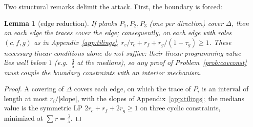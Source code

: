 \documentclass[11pt,reqno]{amsart}
\theoremstyle{plain}
\newtheorem{lemma}[theorem]{Lemma}
\theoremstyle{definition}
\theoremstyle{remark}
\begin{document}
Two structural remarks delimit the attack. First, the boundary is forced:

\begin{lemma}[edge reduction]\label{lem:edgered}
If planks $P_1,P_2,P_3$ (one per direction) cover $\Delta$, then on each edge
the traces cover the edge; consequently, on each edge with roles $(c,f,g)$ as
in Appendix~\ref{app:tilings},
$r_c/\tau_c+r_f+r_g/(1-\tau_g)\ge1$. These necessary linear conditions alone
do \emph{not} suffice: their linear-programming value lies well below $1$
(e.g.\ $\tfrac35$ at the medians), so any proof of
Problem~\ref{prob:covconst} must couple the boundary constraints with an
interior mechanism.
\end{lemma}

\begin{proof}
A covering of $\Delta$ covers each edge, on which the trace of $P_i$ is an
interval of length at most $r_i/|\text{slope}|$, with the slopes of
Appendix~\ref{app:tilings}; the medians value is the symmetric LP
$2r_c+r_f+2r_g\ge1$ on three cyclic constraints, minimized at
$\sum r=\tfrac35$.
\end{proof}
\end{document}
